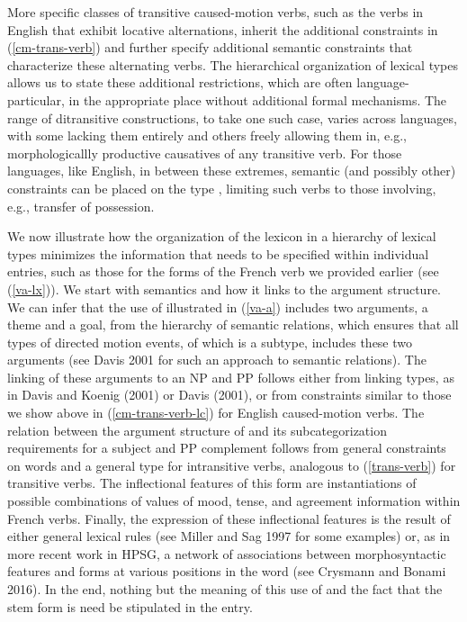 \documentclass[output=paper]{langsci/langscibook}
\begin{document}
More specific classes of transitive caused-motion verbs, such as the  verbs in English that exhibit locative alternations, inherit the additional constraints in (\ref{cm-trans-verb}) and further specify additional semantic constraints that characterize these alternating verbs.
The hierarchical organization of lexical types allows us to state these additional restrictions, which are often language-particular, in the appropriate place without additional formal mechanisms.
The range of ditransitive constructions, to take one such case, varies across languages, with some lacking them entirely and others freely allowing them in, e.g., morphologicallly productive causatives of any transitive verb.
For those languages, like English, in between these extremes, semantic (and possibly other) constraints can be placed on the type , limiting such verbs to those involving, e.g., transfer of possession.

We now illustrate how the organization of the lexicon in a hierarchy of lexical types minimizes the information that needs to be specified within individual entries, such as those for the forms of the French verb  we provided earlier (see (\ref{va-lx})). We start with semantics and how it links to the argument structure. We can infer that the use of  illustrated in (\ref{va-a}) includes two arguments, a theme and a goal, from the hierarchy of semantic relations, which ensures that all types of directed motion events, of which  is a subtype, includes these two arguments (see Davis 2001 for such an approach to semantic relations). The linking of these arguments to an NP and PP follows either from linking types, as in Davis and Koenig (2001) or Davis (2001), or from constraints similar to those we show above in (\ref{cm-trans-verb-lc}) for English caused-motion verbs. The relation between the argument structure of  and its subcategorization requirements for a subject and PP complement follows from general constraints on words and a general type for intransitive verbs, analogous to (\ref{trans-verb}) for transitive verbs. The inflectional features of this form are instantiations of possible combinations of values of mood, tense, and agreement information within French verbs. Finally, the expression of these inflectional features is the result of either general lexical rules (see Miller and Sag 1997 for some examples) or, as in more recent work in HPSG, a network of associations between morphosyntactic features and forms at various positions in the word (see Crysmann and Bonami 2016). In the end, nothing but the meaning of this use of  and the fact that the stem form is  need be stipulated in the entry.
\end{document}
